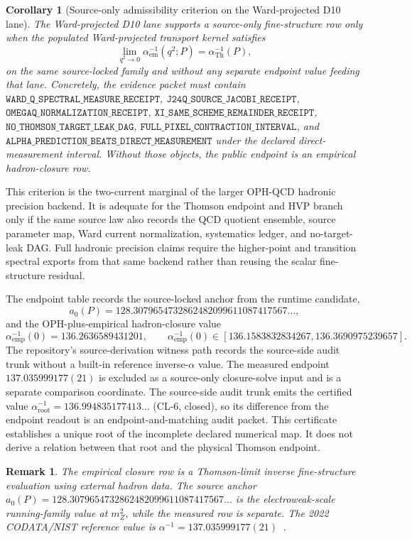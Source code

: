 \documentclass[11pt]{article}
\newtheorem{corollary}[theorem]{Corollary}
\newtheorem{remark}[theorem]{Remark}
\begin{document}
\begin{corollary}[Source-only admissibility criterion on the Ward-projected D10 lane]
The Ward-projected D10 lane supports a source-only fine-structure row only when the populated
Ward-projected transport kernel satisfies
\[
\lim_{q^2\to0}\alpha_{\mathrm{em}}^{-1}(q^2;P)=\alpha_{\mathrm{Th}}^{-1}(P),
\]
on the same source-locked family and without any separate endpoint value feeding that lane.
Concretely, the evidence packet must contain
\(\texttt{WARD\_Q\_SPECTRAL\_MEASURE\_RECEIPT}\),
\(\texttt{J24Q\_SOURCE\_JACOBI\_RECEIPT}\),
\(\texttt{OMEGAQ\_NORMALIZATION\_RECEIPT}\),
\(\texttt{XI\_SAME\_SCHEME\_REMAINDER\_RECEIPT}\),
\(\texttt{NO\_THOMSON\_TARGET\_LEAK\_DAG}\),
\(\texttt{FULL\_PIXEL\_CONTRACTION\_INTERVAL}\), and
\(\texttt{ALPHA\_PREDICTION\_BEATS\_DIRECT\_MEASUREMENT}\) under the declared
direct-measurement interval. Without those objects, the public endpoint is an empirical
hadron-closure row.
\end{corollary}

This criterion is the two-current marginal of the larger OPH-QCD hadronic precision
backend. It is adequate for the Thomson endpoint and HVP branch only if the same source law also
records the QCD quotient ensemble, source parameter map, Ward current normalization, systematics
ledger, and no-target-leak DAG. Full hadronic precision claims require the higher-point and
transition spectral exports from that same backend rather than reusing the scalar fine-structure
residual.

The endpoint table records the source-locked anchor from the runtime candidate,
\[
a_0(P)=128.3079654732862482099611087417567\ldots,
\]
and the OPH-plus-empirical hadron-closure value
\[
\alpha_{\mathrm{emp}}^{-1}(0)=136.2636589431201,
\qquad
\alpha_{\mathrm{emp}}^{-1}(0)\in[136.1583832834267,136.3690975239657].
\]
The repository's source-derivation witness path records the source-side audit trunk without
a built-in reference inverse-\(\alpha\) value. The measured endpoint
\(137.035999177(21)\) is excluded as a source-only closure-solve input and is a separate
comparison coordinate.
The source-side audit trunk emits the certified value
\(\alpha_{\mathrm{root}}^{-1}=136.994835177413\ldots\) (CL-6, closed), so its difference
from the endpoint readout is an endpoint-and-matching audit packet.
This certificate establishes a unique root of the incomplete declared numerical map. It does not
derive a relation between that root and the physical Thomson endpoint.

\begin{remark}
The empirical closure row is a Thomson-limit inverse fine-structure evaluation using external
hadron data. The source anchor
\(a_0(P)=128.3079654732862482099611087417567\ldots\) is the electroweak-scale running-family value at
\(m_Z^2\), while the measured row is separate. The 2022 CODATA/NIST reference value is
\(\alpha^{-1}=137.035999177(21)\)~\cite{codata2022}.
\end{remark}
\end{document}
